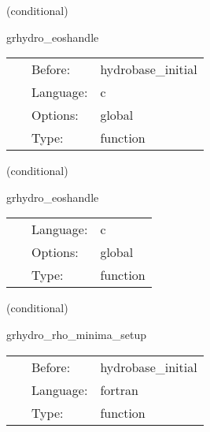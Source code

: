 \vspace{5mm}

   (conditional) 

\hspace{5mm} grhydro\_eoshandle 

\hspace{5mm}{\it set the eos number } 


\hspace{5mm}

 \begin{tabular*}{160mm}{cll} 
~ & Before:  & hydrobase\_initial \\ 
~ & Language:  & c \\ 
~ & Options:  & global \\ 
~ & Type:  & function \\ 
\end{tabular*} 


\vspace{5mm}

   (conditional) 

\hspace{5mm} grhydro\_eoshandle 

\hspace{5mm}{\it set the eos number } 


\hspace{5mm}

 \begin{tabular*}{160mm}{cll} 
~ & Language:  & c \\ 
~ & Options:  & global \\ 
~ & Type:  & function \\ 
\end{tabular*} 


\vspace{5mm}

   (conditional) 

\hspace{5mm} grhydro\_rho\_minima\_setup 

\hspace{5mm}{\it set up minimum for the rest-mass density in the atmosphere (before intial data) } 


\hspace{5mm}

 \begin{tabular*}{160mm}{cll} 
~ & Before:  & hydrobase\_initial \\ 
~ & Language:  & fortran \\ 
~ & Type:  & function \\ 
\end{tabular*} 


